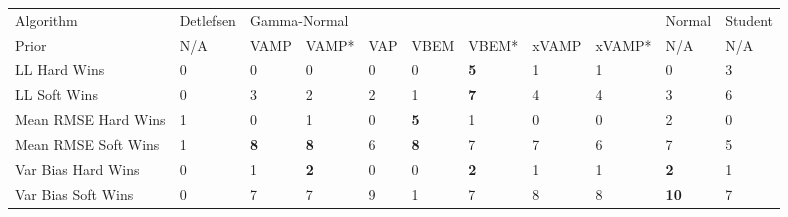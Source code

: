 \begin{tabular}{lllllllllll}
\toprule
Algorithm & Detlefsen & \multicolumn{7}{l}{Gamma-Normal} &       Normal & Student \\
Prior &       N/A &         VAMP &       VAMP* & VAP &        VBEM &       VBEM* & xVAMP & xVAMP* &          N/A &     N/A \\
\midrule
LL Hard Wins        &         0 &            0 &           0 &   0 &           0 &  \textbf{5} &     1 &      1 &            0 &       3 \\
LL Soft Wins        &         0 &            3 &           2 &   2 &           1 &  \textbf{7} &     4 &      4 &            3 &       6 \\
Mean RMSE Hard Wins &         1 &            0 &           1 &   0 &  \textbf{5} &           1 &     0 &      0 &            2 &       0 \\
Mean RMSE Soft Wins &         1 &   \textbf{8} &  \textbf{8} &   6 &  \textbf{8} &           7 &     7 &      6 &            7 &       5 \\
Var Bias Hard Wins  &         0 &            1 &  \textbf{2} &   0 &           0 &  \textbf{2} &     1 &      1 &   \textbf{2} &       1 \\
Var Bias Soft Wins  &         0 &            7 &           7 &   9 &           1 &           7 &     8 &      8 &  \textbf{10} &       7 \\
\bottomrule
\end{tabular}

